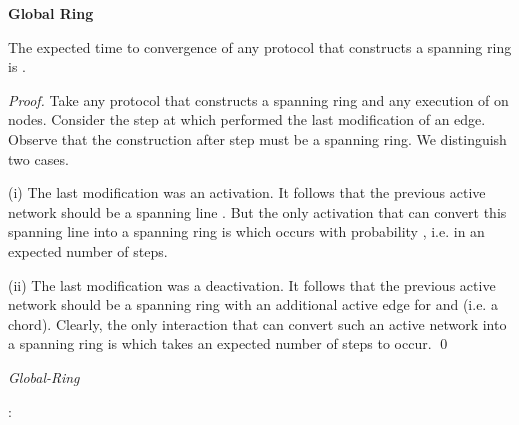 \documentclass[oribibl, 11pt]{llncs}
\begin{document}
\noindent\textbf{Global Ring}

\begin{theorem} 
The expected time to convergence of any protocol that constructs a spanning ring is .
\end{theorem}
\begin{proof}
Take any protocol  that constructs a spanning ring and any execution of  on  nodes. Consider the step  at which  performed the last modification of an edge. Observe that the construction after step  must be a spanning ring. We distinguish two cases. 

(i) The last modification was an activation. It follows that the previous active network should be a spanning line . But the only activation that can convert this spanning line into a spanning ring is  which occurs with probability , i.e. in an expected number of  steps.  

(ii) The last modification was a deactivation. It follows that the previous active network should be a spanning ring  with an additional active edge  for  and  (i.e. a chord). Clearly, the only interaction that can convert such an active network into a spanning ring is  which takes an expected number of  steps to occur.
\qed
\end{proof}

\renewcommand{\algorithmiccomment}[1]{// #1}
\begin{algorithm}[!h]
  \caption{\emph{Global-Ring}}\label{prot:gring}
  \begin{algorithmic}
    \medskip
    \State 
    \State : 
    
    \State {} 
  \end{algorithmic}
\end{algorithm}
\end{document}
